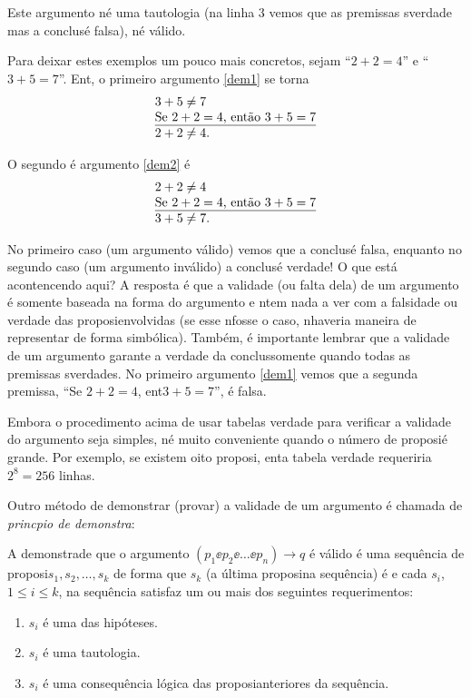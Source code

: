 Este argumento n\ao \'e uma tautologia (na linha 3 vemos que as premissas s\ao verdade mas a conclus\ao \'e falsa), n\ao \'e v\'alido.

Para deixar estes exemplos um pouco mais concretos, sejam \pp ``$2+2=4$'' e \qq ``$3+5=7$''. Ent\aoi, o primeiro argumento \ref{dem1} se torna 
\begin{eqnarray*}
\begin{tabular}{l}
$3+5\neq 7$ \\
\underline{Se $2+2=4$, ent\ao $3+5=7$} \\
$2+2\neq 4$.
\end{tabular}
\end{eqnarray*}

O segundo \'e argumento \ref{dem2} \'e
\begin{eqnarray*}
\begin{tabular}{l}
$2+2\neq 4$ \\
\underline{Se $2+2=4$, ent\ao $3+5=7$} \\
$3+5\neq 7$.
\end{tabular}
\end{eqnarray*}


No primeiro caso (um argumento v\'alido) vemos que a conclus\ao \'e falsa, enquanto no segundo caso (um argumento inv\'alido) a conclus\ao \'e verdade! O que est\'a acontencendo aqui? A resposta \'e que a validade (ou falta dela) de um argumento \'e somente baseada na forma do argumento e n\ao tem nada a ver com a falsidade ou verdade das proposi\coes envolvidas (se esse n\ao fosse o caso, n\ao haveria maneira de representar de forma simb\'olica). Tamb\'em, \'e importante lembrar que a validade de um argumento garante a verdade da conclus\ao somente quando todas as premissas s\ao verdades. No primeiro argumento \ref{dem1} vemos que a segunda premissa, ``Se $2+2=4$, ent\ao $3+5=7$'', \'e falsa.

Embora o procedimento acima de usar tabelas verdade para verificar a validade do argumento seja simples, n\ao \'e muito conveniente quando o n\'umero de proposi\coes \'e grande. Por exemplo, se existem oito proposi\cois, ent\ao a tabela verdade requeriria $2^8=256$ linhas.   

Outro m\'etodo de demonstrar (provar) a validade de um argumento \'e chamada de {\it princ\ih pio de demonstra\cao}:

A demonstra\cao de que o argumento $(p_1\ee p_2\ee \ldots\ee p_n)\to q$ \'e v\'alido \'e uma sequ\^encia de proposi\coes $s_1,s_2,\ldots,s_k$ de forma que $s_k$ (a \'ultima proposi\cao na sequ\^encia) \'e \qq e cada $s_i$, $1\leq i \leq k$, na sequ\^encia satisfaz um ou mais dos seguintes requerimentos:  
\begin{enumerate}[{\bf a)}]
\item $s_i$ \'e uma das hip\'oteses.
\item $s_i$ \'e uma tautologia.
\item $s_i$ \'e uma consequ\^encia l\'ogica das proposi\coes anteriores da sequ\^encia.
\end{enumerate}

